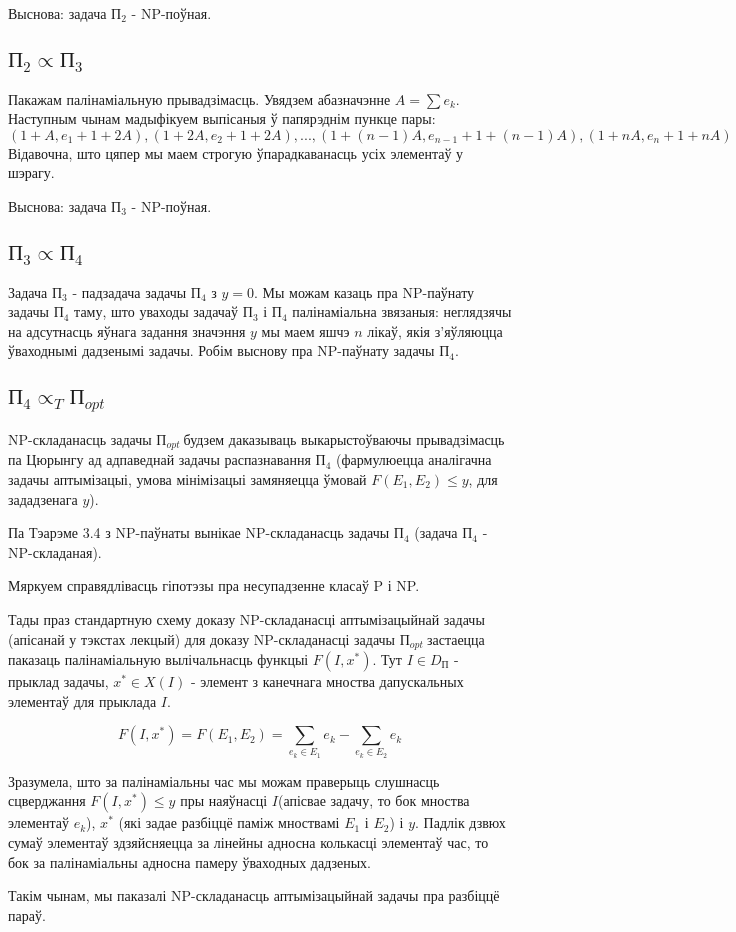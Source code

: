 \documentclass{article}
\newcommand{\opt}{${\text{П}}_{opt}\ $}
\begin{document}
Выснова: задача ${\text{П}}_{2}$ - NP-поўная.

\subsection*{${\text{П}}_{2} \propto {\text{П}}_{3}$}

Пакажам палінаміальную прывадзімасць. Увядзем абазначэнне $A = \sum{e_k}$.
Наступным чынам мадыфікуем выпісаныя ў папярэднім пункце пары:
\[
    (1+A, e_1+1+2A), (1+2A, e_2+1+2A), ... , (1+(n-1)A, e_{n-1}+1+(n-1)A), (1+nA, e_n+1+nA)
\]
Відавочна, што цяпер мы маем строгую ўпарадкаванасць усіх элементаў у шэрагу.

Выснова: задача ${\text{П}}_{3}$ - NP-поўная.

\subsection*{${\text{П}}_{3} \propto {\text{П}}_{4}$}

Задача ${\text{П}}_{3}$ - падзадача задачы ${\text{П}}_{4}$ з $y = 0$. Мы можам
казаць пра NP-паўнату задачы ${\text{П}}_{4}$ таму, што уваходы задачаў ${\text{П}}_{3}$
і ${\text{П}}_{4}$ палінаміальна звязаныя: неглядзячы на адсутнасць яўнага
задання значэння $y$ мы маем яшчэ $n$ лікаў, якія з'яўляюцца ўваходнымі дадзенымі
задачы. Робім выснову пра NP-паўнату задачы ${\text{П}}_{4}$.

\subsection*{${\text{П}}_{4} \propto_{T} {\text{П}}_{opt}$}

NP-складанасць задачы \opt будзем даказываць выкарыстоўваючы прывадзімасць па
Цюрынгу ад адпаведнай задачы распазнавання ${\text{П}}_{4}$
(фармулюецца аналігачна задачы аптымізацыі,
умова мінімізацыі замяняецца ўмовай $F(E_1, E_2) \leq y$, для зададзенага $y$).

Па Тэарэме 3.4 з NP-паўнаты вынікае NP-складанасць задачы ${\text{П}}_{4}$
(задача ${\text{П}}_{4}$ - NP-складаная).

Мяркуем справядлівасць гіпотэзы пра несупадзенне класаў P і NP.

Тады праз стандартную схему доказу NP-складанасці аптымізацыйнай задачы
(апісанай у тэкстах лекцый) для доказу NP-складанасці задачы \opt застаецца
паказаць палінаміальную вылічальнасць функцыі $F(I, x^{*})$. Тут $I \in D_{\text{П}}$ -
прыклад задачы, $x^{*} \in X(I)$ - элемент з канечнага мноства дапускальных
элементаў для прыклада $I$.

\[
F(I, x^{*}) = F(E_1, E_2) = \sum_{e_k \in E_1}{e_k} - \sum_{e_k \in E_2}{e_k}
\]

Зразумела, што за палінаміальны час мы можам праверыць слушнасць сцверджання
$F(I, x^{*}) \leq y$ пры наяўнасці $I$(апісвае задачу, то бок мноства элементаў
$e_k$), $x^{*}$ (які задае разбіццё паміж мноствамі $E_1$ і $E_2$) і $y$. Падлік
дзвюх сумаў элементаў здзяйсняецца за лінейны адносна колькасці элементаў час,
то бок за палінаміальны адносна памеру ўваходных дадзеных.

Такім чынам, мы паказалі NP-складанасць аптымізацыйнай задачы пра разбіццё параў.
\end{document}
